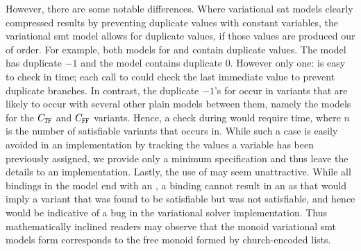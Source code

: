 However, there are some notable differences. Where variational \ac{sat} models
clearly compressed results by preventing duplicate values with constant
variables, the variational \ac{smt} model allows for duplicate values, if those
values are produced our of order. For example, both models for \iV{} and \cV{}
contain duplicate values. The \iV{} model has duplicate $-1$ and the \cV{} model
contains duplicate $0$. However only one: \cV{} is easy to check in 
time; each call to  could check the last immediate value to prevent
duplicate branches. In contrast, the duplicate $-1$'s for \iV{} occur in
variants that are likely to occur with several other plain models between them,
namely the models for the $C_{\texttt{T}\texttt{F}}$ and $C_{\texttt{F}\texttt{F}}$ variants. Hence, a
check during  would require  time, where $n$ is the number
of satisfiable variants that \iV{} occurs in. While such a case is easily
avoided in an implementation by tracking the values a variable has been
previously assigned, we provide only a minimum specification and thus leave the
details to an implementation.
%
Lastly, the use of \undefined{} may seem unattractive. While all bindings in the
model end with an \undefined{}, a binding cannot result in an \undefined{} as
that would imply a variant that was found to be satisfiable but was not
satisfiable, and hence would be indicative of a bug in the variational solver
implementation. Thus mathematically inclined readers may observe that the monoid
variational \ac{smt} models form corresponds to the free monoid formed by
church-encoded lists.

